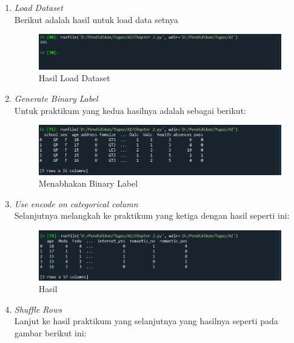\documentclass{report}
\begin{document}
\begin{enumerate}
  \item \emph{Load Dataset}
   \\\hangindent=0.5cm Berikut adalah hasil untuk load data setnya
   
   \begin{figure}[hbtp]
   \caption{Hasil Load Dataset}
   \centering
   \includegraphics[scale=0.6]{../figures/Chapter 2 (1).PNG}
   \end{figure}
   
  
  \item \emph{Generate Binary Label}
   \\\hangindent=0.5cm Untuk praktikum yang kedua hasilnya adalah sebagai berikut:
   
   \begin{figure}[hbtp]
   \caption{Menabhakan Binary Label}
   \centering
   \includegraphics[scale=0.5]{../figures/Chapter 2 (2).PNG}
   \end{figure}
   
   
  \item \emph{Use encode on categorical column}
   \\\hangindent=0.5cm Selanjutnya melangkah ke praktikum yang ketiga dengan hasil seperti ini:
   
   \begin{figure}[hbtp]
   \caption{Hasil}
   \centering
   \includegraphics[scale=0.4]{../figures/Chapter 2 (3).PNG}
   \end{figure}
   
   
  \item \emph{Shuffle Rows}
   \\\hangindent=0.5cm Lanjut ke hasil praktikum yang selanjutnya yang hasilnya seperti pada gambar berikut ini:
   

\end{enumerate}
\end{document}
